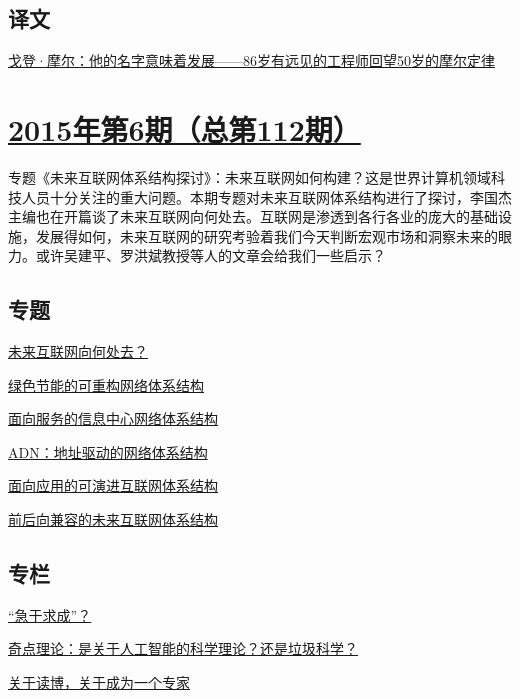 \documentclass[a4paper]{article}
\begin{document}
\subsection{译文}
\href{http://history.ccf.org.cn/resources/1190201776262/2015/06/12/16.pdf}{戈登·摩尔：他的名字意味着发展——86岁有远见的工程师回望50岁的摩尔定律}


\section{\href{http://history.ccf.org.cn/sites/ccf/jsjtbbd.jsp?contentId=2867635215085}{\textbf{2015年第6期（总第112期）}}}
专题《未来互联网体系结构探讨》：未来互联网如何构建？这是世界计算机领域科技人员十分关注的重大问题。本期专题对未来互联网体系结构进行了探讨，李国杰主编也在开篇谈了未来互联网向何处去。互联网是渗透到各行各业的庞大的基础设施，发展得如何，未来互联网的研究考验着我们今天判断宏观市场和洞察未来的眼力。或许吴建平、罗洪斌教授等人的文章会给我们一些启示？
\subsection{专题}
\href{http://history.ccf.org.cn/resources/1190201776262/2015/06/12/1.pdf}{未来互联网向何处去？}

\href{http://history.ccf.org.cn/resources/1190201776262/2015/06/12/4.pdf}{绿色节能的可重构网络体系结构}

\href{http://history.ccf.org.cn/resources/1190201776262/2015/06/12/5.pdf}{面向服务的信息中心网络体系结构}

\href{http://history.ccf.org.cn/resources/1190201776262/2015/06/12/2.pdf}{ADN：地址驱动的网络体系结构}

\href{http://history.ccf.org.cn/resources/1190201776262/2015/06/23/6.pdf}{面向应用的可演进互联网体系结构}

\href{http://history.ccf.org.cn/resources/1190201776262/2015/06/12/3.pdf}{前后向兼容的未来互联网体系结构}

\subsection{专栏}
\href{http://history.ccf.org.cn/resources/1190201776262/2015/06/12/10.pdf}{“急于求成”？}

\href{http://history.ccf.org.cn/resources/1190201776262/2015/06/12/7.pdf}{奇点理论：是关于人工智能的科学理论？还是垃圾科学？}

\href{http://history.ccf.org.cn/resources/1190201776262/2015/06/12/8.pdf}{关于读博，关于成为一个专家}
\end{document}

